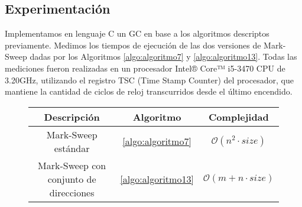 
%




\subsection{Experimentación}

Implementamos en lenguaje C un GC en base a los algoritmos descriptos previamente. Medimos los tiempos de ejecución de las dos versiones de Mark-Sweep dadas por los Algoritmos \ref{algo:algoritmo7} y \ref{algo:algoritmo13}. Todas las mediciones fueron realizadas en un procesador Intel® Core™ i5-3470 CPU de 3.20GHz, utilizando el registro TSC (Time Stamp Counter) del procesador, que mantiene la cantidad de ciclos de reloj transcurridos desde el último encendido.

\begin{figure}
\begin{center}
\begin{tabular}{|c|c|c|}
\hline
\textbf{Descripción} & \textbf{Algoritmo} & \textbf{Complejidad}\\
\hline
\hline
Mark-Sweep estándar & \ref{algo:algoritmo7} & $\mathcal{O}(n^2 \cdot size)$\\
\hline
Mark-Sweep con conjunto de direcciones & \ref{algo:algoritmo13} & $\mathcal{O}(m + n \cdot size)$\\
\hline
\end{tabular}
\label{cuad:cuadro1}
\end{center}
\end{figure}

